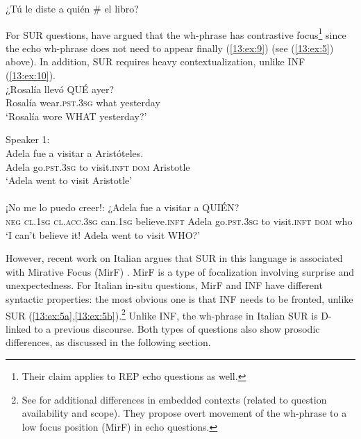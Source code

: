 \documentclass[output=paper,colorlinks,citecolor=brown,draftmode]{langscibook}
\begin{document}
 \label{13:ex:8c}


\ex  ¿Tú le diste a quién \# el libro? \label{13:ex:8d}
\z
\z

For SUR questions, \citet{RegleroTicio2013}  have argued that the wh-phrase has contrastive focus\footnote{Their claim applies to REP echo questions as well.}  since the echo wh-phrase does not need to appear finally (\ref{13:ex:9}) (see (\ref{13:ex:5}) above). In addition, SUR requires heavy contextualization, unlike INF (\ref{13:ex:10}).\\

\ea \label{13:ex:9}%
 \gll ¿Rosalía llevó              QUÉ ayer?\\
Rosalía  wear.\textsc{pst}.3\textsc{sg} what yesterday\\
\glt ‘Rosalía wore WHAT yesterday?’\\
\z


\ea \label{13:ex:10} %
{Speaker 1:} \\
\gll Adela fue a visitar a Aristóteles.\\
Adela go.\textsc{pst}.3\textsc{sg}  to visit.\textsc{inft} \textsc{dom}  Aristotle\\
\glt ‘Adela went to visit Aristotle’\\

\\
\gll ¡No  me lo puedo creer!: ¿Adela    fue a visitar a QUIÉN?\\
\textsc{neg} \textsc{cl}.1\textsc{sg}  \textsc{cl}.\textsc{acc}.3\textsc{sg}  can.1\textsc{sg}    believe.\textsc{inft}  Adela    go.\textsc{pst}.3\textsc{sg}  to visit.\textsc{inft} \textsc{dom}  who\\
\glt ‘I can’t believe it! Adela went to visit WHO?’\\
\z

However, recent work on Italian argues that SUR in this language is associated with Mirative Focus (MirF) \citep{crocco2016,BadanFiori2017,BadanCrocco2019}. MirF is a type of focalization involving surprise and unexpectedness. For Italian in-situ questions, MirF and INF have different syntactic properties: the most obvious one is that INF needs to be fronted, unlike SUR (\ref{13:ex:5a},\ref{13:ex:5b}).\footnote{See \citet{BadanCrocco2019} for additional differences in embedded contexts (related to question availability and scope). They propose overt movement of the wh-phrase to a low focus position (MirF) in echo questions.} Unlike INF, the wh-phrase in Italian SUR is D-linked to a previous discourse. Both types of questions also show prosodic differences, as discussed in the following section.\\
\end{document}
